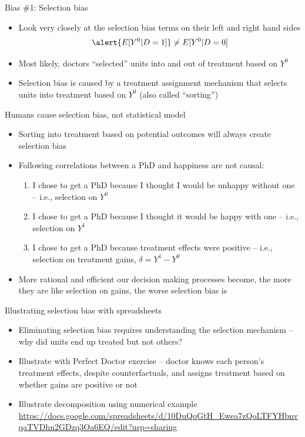 \documentclass{beamer}
\begin{document}
\begin{frame}{Bias \#1: Selection bias}

  \begin{itemize}
    \item Look very closely at the selection bias terms on their left and right hand sides $$\alert{E[Y^0|D=1]} \neq E[Y^0 |D=0]$$
    \item Most likely, doctors ``selected'' units into and out of treatment based on $Y^0$
    \item Selection bias is caused by a treatment assignment mechanism that selects units into treatment based on $Y^0$ (also called ``sorting'')
      \end{itemize}

\end{frame}



\begin{frame}{Humans cause selection bias, not statistical model}

\begin{itemize}
\item Sorting into treatment based on potential outcomes will always create selection bias 
\item Following correlations between a PhD and happiness are not causal:
	\begin{enumerate}
	\item I chose to get a PhD because I thought I would be unhappy without one -- i.e., selection on $Y^0$ 
	\item I chose to get a PhD because I thought it would be happy with one -- i.e., selection on $Y^1$ 
	\item I chose to get a PhD because treatment effects were positive -- i.e., selection on treatment gains, $\delta = Y^1-Y^0$
	\end{enumerate}
\item More rational and efficient our decision making processes become, the more they are like selection on gains, the worse selection bias is
\end{itemize}

\end{frame}






\begin{frame}{Illustrating selection bias with spreadsheets}
\begin{itemize}
\item Eliminating selection bias requires understanding the selection mechanism -- why did units end up treated but not others?
\item Illustrate with Perfect Doctor exercise -- doctor knows each person's treatment effects, despite counterfactuals, and assigns treatment based on whether gains are positive or not
\item Illustrate decomposition using numerical example \url{https://docs.google.com/spreadsheets/d/10DuQqGtH_Ewea7zQoLTFYHbnvqaTVDhn2GDzq3Oa6EQ/edit?usp=sharing}
\end{itemize}
\end{frame}
\end{document}
